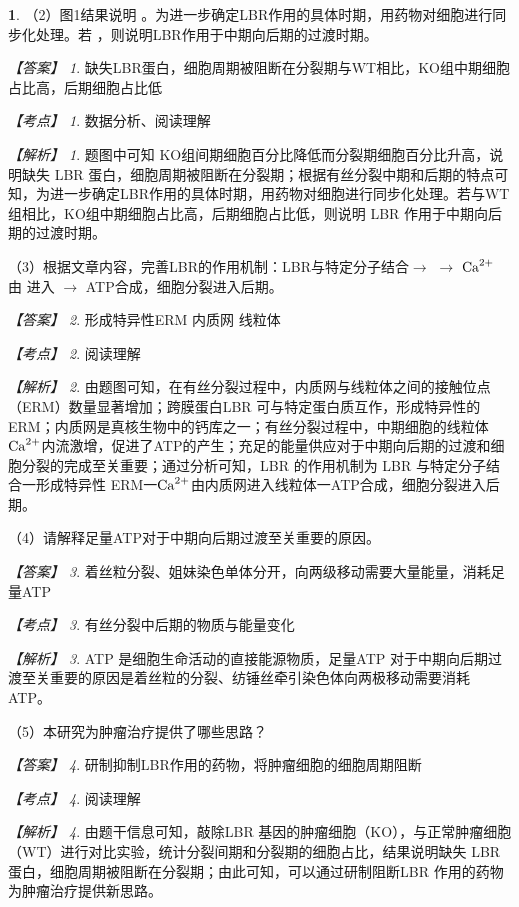 \documentclass[UTF8, 10pt, a4paper, oneside]{ctexart}
\newcommand{\blank}{ \underbar{\quad$\blacktriangle$\quad} }%
\theoremstyle{definition}
\newtheorem{exercise}{}
\theoremstyle{remark}
\newtheorem*{answer}{【答案】}
\newtheorem*{point}{【考点】}      %
\newtheorem*{explanation}{【解析】}     %
\theoremstyle{plain}
\begin{document}
\begin{exercise}
（2）图1结果说明\blank 。为进一步确定LBR作用的具体时期，用药物对细胞进行同步化处理。若\blank ，则说明LBR作用于中期向后期的过渡时期。

\begin{answer}
    缺失LBR蛋白，细胞周期被阻断在分裂期\qquad 与WT相比，KO组中期细胞占比高，后期细胞占比低
\end{answer}
\begin{point}
    数据分析、阅读理解
\end{point}
\begin{explanation}
    题图中可知 KO组间期细胞百分比降低而分裂期细胞百分比升高，说明缺失 LBR 蛋白，细胞周期被阻断在分裂期；根据有丝分裂中期和后期的特点可知，为进一步确定LBR作用的具体时期，用药物对细胞进行同步化处理。若与WT组相比，KO组中期细胞占比高，后期细胞占比低，则说明 LBR 作用于中期向后期的过渡时期。
\end{explanation}

（3）根据文章内容，完善LBR的作用机制：LBR与特定分子结合$\rightarrow$ \blank $\rightarrow$ $\ce{Ca^2+}$ 由 \blank 进入\blank $\rightarrow$ ATP合成，细胞分裂进入后期。

\begin{answer}
    形成特异性ERM \qquad 内质网 \qquad 线粒体
\end{answer}
\begin{point}
    阅读理解
\end{point}
\begin{explanation}
    由题图可知，在有丝分裂过程中，内质网与线粒体之间的接触位点（ERM）数量显著增加；跨膜蛋白LBR 可与特定蛋白质互作，形成特异性的 ERM；内质网是真核生物中的钙库之一；有丝分裂过程中，中期细胞的线粒体 $\ce{Ca^2+}$内流激增，促进了ATP的产生；充足的能量供应对于中期向后期的过渡和细胞分裂的完成至关重要；通过分析可知，LBR 的作用机制为 LBR 与特定分子结合一形成特异性 ERM一$\ce{Ca^2+}$由内质网进入线粒体一ATP合成，细胞分裂进入后期。
\end{explanation}

（4）请解释足量ATP对于中期向后期过渡至关重要的原因。

\begin{answer}
    着丝粒分裂、姐妹染色单体分开，向两级移动需要大量能量，消耗足量ATP
\end{answer}
\begin{point}
    有丝分裂中后期的物质与能量变化
\end{point}
\begin{explanation}
    ATP 是细胞生命活动的直接能源物质，足量ATP 对于中期向后期过渡至关重要的原因是着丝粒的分裂、纺锤丝牵引染色体向两极移动需要消耗 ATP。
\end{explanation}

（5）本研究为肿瘤治疗提供了哪些思路？

\begin{answer}
    研制抑制LBR作用的药物，将肿瘤细胞的细胞周期阻断
\end{answer}
\begin{point}
    阅读理解
\end{point}
\begin{explanation}
    由题干信息可知，敲除LBR 基因的肿瘤细胞（KO），与正常肿瘤细胞（WT）进行对比实验，统计分裂间期和分裂期的细胞占比，结果说明缺失 LBR 蛋白，细胞周期被阻断在分裂期；由此可知，可以通过研制阻断LBR 作用的药物为肿瘤治疗提供新思路。
\end{explanation}

\end{exercise}
\end{document}
